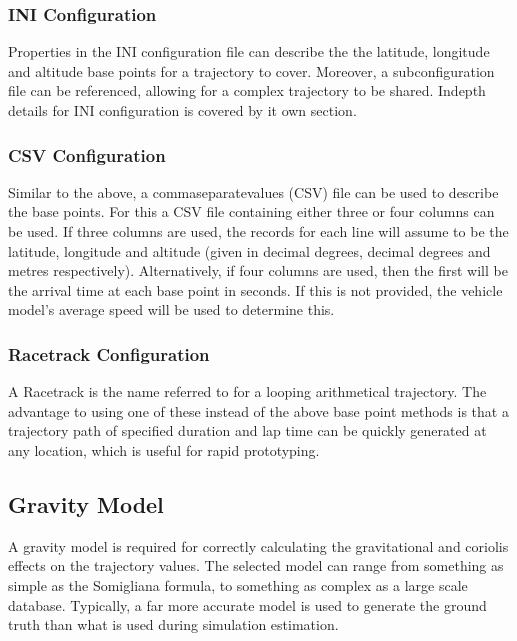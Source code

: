 \documentclass[letterpaper,10pt,english]{sphinxmanual}
\begin{document}
\subsubsection{INI Configuration}
\label{\detokenize{usage/trajectory:ini-configuration}}
\sphinxAtStartPar
Properties in the INI configuration file can describe the the latitude, longitude and altitude base points for a
trajectory to cover. Moreover, a sub\sphinxhyphen{}configuration file can be referenced, allowing for a complex trajectory to be
shared. Indepth details for INI configuration is covered by it own section.


\subsubsection{CSV Configuration}
\label{\detokenize{usage/trajectory:csv-configuration}}
\sphinxAtStartPar
Similar to the above, a comma\sphinxhyphen{}separate\sphinxhyphen{}values (CSV) file can be used to describe the base points. For this a CSV file
containing either three or four columns can be used. If three columns are used, the records for each line will
assume to be the latitude, longitude and altitude (given in decimal degrees, decimal degrees and metres respectively).
Alternatively, if four columns are used, then the first will be the arrival time at each base point in seconds. If this
is not provided, the vehicle model’s average speed will be used to determine this.


\subsubsection{Racetrack Configuration}
\label{\detokenize{usage/trajectory:racetrack-configuration}}
\sphinxAtStartPar
A Racetrack is the name referred to for a looping arithmetical trajectory. The advantage to using one of these instead
of the above base point methods is that a trajectory path of specified duration and lap time can be quickly generated
at any location, which is useful for rapid prototyping.


\subsection{Gravity Model}
\label{\detokenize{usage/trajectory:gravity-model}}
\sphinxAtStartPar
A gravity model is required for correctly calculating the gravitational and coriolis effects on the trajectory values.
The selected model can range from something as simple as the Somigliana formula, to something as complex as a large
scale database. Typically, a far more accurate model is used to generate the ground truth than what is used during
simulation estimation.
\end{document}

